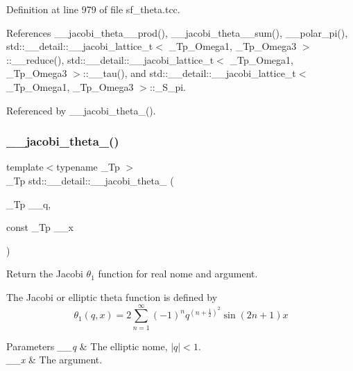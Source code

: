 Definition at line 979 of file sf\+\_\+theta.\+tcc.



References \+\_\+\+\_\+jacobi\+\_\+theta\+\_\+\_\+prod(), \+\_\+\+\_\+jacobi\+\_\+theta\+\_\+\_\+sum(), \+\_\+\+\_\+polar\+\_\+pi(), std\+::\+\_\+\+\_\+detail\+::\+\_\+\+\_\+jacobi\+\_\+lattice\+\_\+t$<$ \+\_\+\+Tp\+\_\+\+Omega1, \+\_\+\+Tp\+\_\+\+Omega3 $>$\+::\+\_\+\+\_\+reduce(), std\+::\+\_\+\+\_\+detail\+::\+\_\+\+\_\+jacobi\+\_\+lattice\+\_\+t$<$ \+\_\+\+Tp\+\_\+\+Omega1, \+\_\+\+Tp\+\_\+\+Omega3 $>$\+::\+\_\+\+\_\+tau(), and std\+::\+\_\+\+\_\+detail\+::\+\_\+\+\_\+jacobi\+\_\+lattice\+\_\+t$<$ \+\_\+\+Tp\+\_\+\+Omega1, \+\_\+\+Tp\+\_\+\+Omega3 $>$\+::\+\_\+\+S\+\_\+pi.



Referenced by \+\_\+\+\_\+jacobi\+\_\+theta\+\_().

\mbox{\label{namespacestd_1_1____detail_af98af6bb3dd83f6a28c777d8fbaa5e51}} 
\subsubsection{\texorpdfstring{\+\_\+\+\_\+jacobi\+\_\+theta\+\_()}{\_\_jacobi\_theta\_1()}\hspace{0.1cm}{\footnotesize\ttfamily [2/2]}}
{\footnotesize\ttfamily template$<$typename \+\_\+\+Tp $>$ \\
\+\_\+\+Tp std\+::\+\_\+\+\_\+detail\+::\+\_\+\+\_\+jacobi\+\_\+theta\+\_ (\begin{DoxyParamCaption}\item[{\+\_\+\+Tp}]{\+\_\+\+\_\+q,  }\item[{const \+\_\+\+Tp}]{\+\_\+\+\_\+x }\end{DoxyParamCaption})}

Return the Jacobi $ \theta_1 $ function for real nome and argument.

The Jacobi or elliptic theta function is defined by \[ \theta_1(q,x) = 2\sum_{n=1}^{\infty}(-1)^n q^{(n+\frac{1}{2})^2}\sin{(2n+1)x} \]


\begin{DoxyParams}{Parameters}
{\em \+\_\+\+\_\+q} & The elliptic nome, $ |q| < 1 $. \\
\hline
{\em \+\_\+\+\_\+x} & The argument. \\
\hline
\end{DoxyParams}



